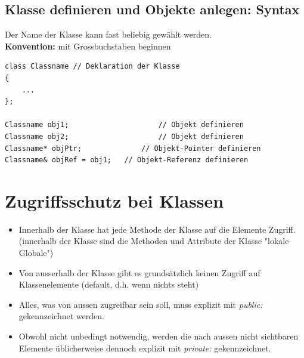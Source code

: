 \clearpage
\subsection{Klasse definieren und Objekte anlegen: Syntax}
Der Name der Klasse kann fast beliebig gewählt werden.\\
\textbf{Konvention:} mit Grossbuchstaben beginnen
\begin{minipage}{0.7\linewidth}
\vspace{-\baselineskip}
\begin{lstlisting}
class Classname	// Deklaration der Klasse
{
	...
};

Classname obj1;						// Objekt definieren
Classname obj2;						// Objekt definieren
Classname* objPtr;				// Objekt-Pointer definieren
Classname& objRef = obj1;	// Objekt-Referenz definieren
\end{lstlisting}
\end{minipage}

\section{Zugriffsschutz bei Klassen}
\begin{itemize}
	\item Innerhalb der Klasse hat jede Methode der Klasse auf die Elemente Zugriff. (innerhalb der Klasse sind die Methoden und Attribute der Klasse "lokale Globale")
	\item Von ausserhalb der Klasse gibt es grundsätzlich keinen Zugriff auf Klassenelemente (default, d.h. wenn nichts steht)
	\item Alles, was von aussen zugreifbar sein soll, muss explizit mit \emph{public:} gekennzeichnet werden.
	\item Obwohl nicht unbedingt notwendig, werden die nach aussen nicht sichtbaren Elemente üblicherweise dennoch explizit mit \emph{private:} gekennzeichnet.
\end{itemize}

